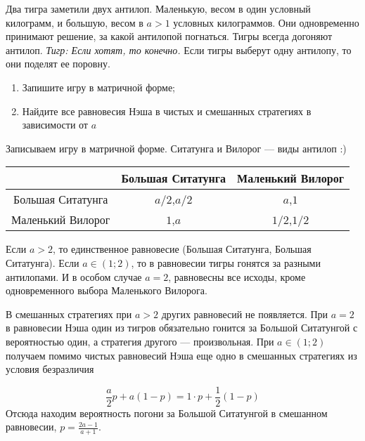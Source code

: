 \begin{problem}
Два тигра заметили двух антилоп. Маленькую, весом в один условный килограмм, и большую, весом в  $a>1$  условных килограммов. Они одновременно принимают решение, за какой антилопой погнаться. Тигры всегда догоняют антилоп. {\it Тигр: Если хотят, то конечно.} Если тигры выберут одну антилопу, то они поделят ее поровну.
\begin{enumerate}
\item  Запишите игру в матричной форме;
\item Найдите все равновесия Нэша в чистых и смешанных стратегиях в зависимости от  $a$
\end{enumerate}
\end{problem}

\begin{solution}
Записываем игру в матричной форме. Ситатунга и Вилорог --- виды антилоп :)

\begin{tabular}{c|cc}
 & Большая Ситатунга & Маленький Вилорог \\ 
\hline 
Большая Ситатунга & $a/2$,$a/2$ & $a$,$1$ \\ 
Маленький Вилорог & $1$,$a$ & $1/2$,$1/2$ 
\end{tabular} 

Если $a>2$, то единственное равновесие (Большая Ситатунга, Большая Ситатунга). Если $a \in (1;2)$, то в равновесии тигры гонятся за разными антилопами. И в особом случае $a=2$, равновесны все исходы, кроме одновременного выбора Маленького Вилорога.

В смешанных стратегиях при $a>2$ других равновесий не появляется. При $a=2$ в равновесии Нэша один из тигров обязательно гонится за Большой Ситатунгой с вероятностью один, а стратегия другого --- произвольная. При $a\in (1;2)$ получаем помимо чистых равновесий Нэша еще одно в смешанных стратегиях из условия безразличия

\[
\frac{a}{2}p+a(1-p)=1\cdot p + \frac{1}{2}(1-p)
\]
Отсюда находим вероятность погони за Большой Ситатунгой в смешанном равновесии, $p=\frac{2a-1}{a+1}$.
\end{solution}


